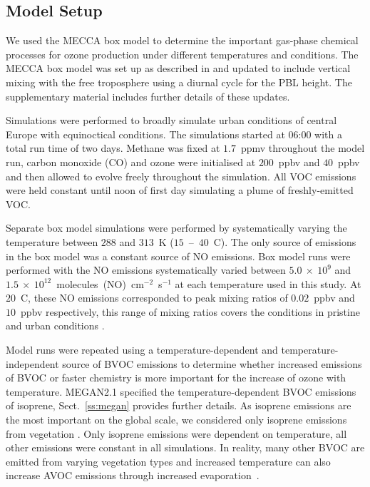 \subsection{Model Setup} \label{ss:model_setup}
We used the MECCA box model to determine the important gas-phase chemical processes for ozone production under different temperatures and  conditions.
The MECCA box model was set up as described in \citet{Coates:2015} and updated to include vertical mixing with the free troposphere using a diurnal cycle for the PBL height.
The supplementary material includes further details of these updates.

Simulations were performed to broadly simulate urban conditions of central Europe with equinoctical conditions.
The simulations started at 06:00 with a total run time of two days.
Methane was fixed at $1.7$~ppmv throughout the model run, carbon monoxide (CO) and ozone were initialised at $200$~ppbv and $40$~ppbv and then allowed to evolve freely throughout the simulation.
All VOC emissions were held constant until noon of first day simulating a plume of freshly-emitted VOC.

Separate box model simulations were performed by systematically varying the temperature between $288$ and $313$~K ($15$~--~$40$~\degree C). 
The only source of  emissions in the box model was a constant source of NO emissions. 
Box model runs were performed with the NO emissions systematically varied between $5.0~\times~10^9$ and $1.5~\times~10^{12}$~molecules~(NO)~cm$^{-2}$~s$^{-1}$ at each temperature used in this study. 
At $20$~\degree C, these NO emissions corresponded to peak  mixing ratios of $0.02$~ppbv and $10$~ppbv respectively, this range of  mixing ratios covers the  conditions in pristine and urban conditions \citep{vonSchneidemesser:2015a}.

Model runs were repeated using a temperature-dependent and temperature-independent source of BVOC emissions to determine whether increased emissions of BVOC or faster chemistry is more important for the increase of ozone with temperature. 
MEGAN2.1 \citep{Guenther:2012} specified the temperature-dependent BVOC emissions of isoprene, Sect.~\ref{ss:megan} provides further details. 
As isoprene emissions are the most important on the global scale, we considered only isoprene emissions from vegetation \citep{Guenther:2006}. 
Only isoprene emissions were dependent on temperature, all other emissions were constant in all simulations.
In reality, many other BVOC are emitted from varying vegetation types \citep{Guenther:2006} and increased temperature can also increase AVOC emissions through increased \mbox{evaporation \citep{Rubin:2006}}.


